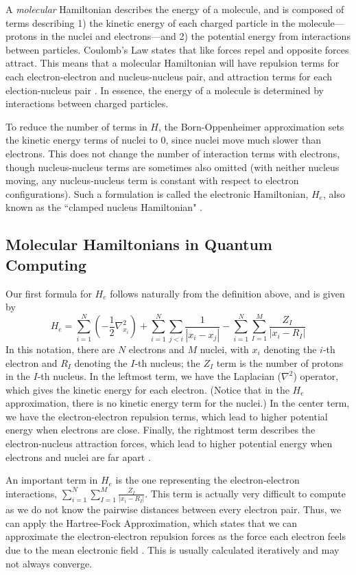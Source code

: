 \documentclass[11pt]{article}
\begin{document}
A \emph{molecular} Hamiltonian describes the energy of a molecule, and is composed of terms describing 1) the kinetic energy of each charged particle in the molecule---protons in the nuclei and electrons---and 2) the potential energy from interactions between particles. Coulomb’s Law states that like forces repel and opposite forces attract. This means that a molecular Hamiltonian will have repulsion terms for each electron-electron and nucleus-nucleus pair, and attraction terms for each election-nucleus pair \cite{Skylaris-L2}. In essence, the energy of a molecule is determined by interactions between charged particles.

To reduce the number of terms in $H$, the Born-Oppenheimer approximation sets the kinetic energy terms of nuclei to $0$, since nuclei move much slower than electrons. This does not change the number of interaction terms with electrons, though nucleus-nucleus terms are sometimes also omitted (with neither nucleus moving, any nucleus-nucleus term is constant with respect to electron configurations). Such a formulation is called the electronic Hamiltonian, $H_e$, also known as the ``clamped nucleus Hamiltonian" \cite{Skylaris-L2}.

\subsection{Molecular Hamiltonians in Quantum Computing}
Our first formula for $H_e$ follows naturally from the definition above, and is given by 
$$
H_e =
\sum_{i=1}^{N} \left( -\frac{1}{2} \nabla_{x_i}^2 \right) +
\sum_{i=1}^{N} \sum_{j < i} \frac{1}{|x_i - x_j|} -
\sum_{i=1}^{N} \sum_{I = 1}^{M} \frac{Z_I}{|x_i - R_I|}
$$
In this notation, there are $N$ electrons and $M$ nuclei, with $x_i$ denoting the $i$-th electron and $R_I$ denoting the $I$-th nucleus; the $Z_I$ term is the number of protons in the $I$-th nucleus. In the leftmost term, we have the Laplacian ($\nabla^2$) operator, which gives the kinetic energy for each electron. (Notice that in the $H_e$ approximation, there is no kinetic energy term for the nuclei.) In the center term, we have the electron-electron repulsion terms, which lead to higher potential energy when electrons are close. Finally, the rightmost term describes the electron-nucleus attraction forces, which lead to higher potential energy when electrons and nuclei are far apart \cite{Baidu}.

An important term in $H_e$ is the one representing the electron-electron interactions, $\sum_{i=1}^{N} \sum_{I = 1}^{M} \frac{Z_I}{|x_i - R_I|}$. This term is actually very difficult to compute as we do not know the pairwise distances between every electron pair. Thus, we can apply the Hartree-Fock Approximation, which states that we can approximate the electron-electron repulsion forces as the force each electron feels due to the mean electronic field \cite{Ivo}. This is usually calculated iteratively and may not always converge. 
\end{document}
